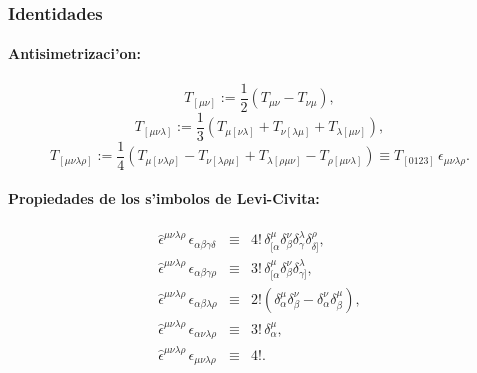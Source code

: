 \subsubsection{Identidades}

\paragraph{Antisimetrizaci'on:}

\begin{equation}
T_{[\mu\nu]}:=\frac{1}{2}(T_{\mu\nu}-T_{\nu\mu}),
\end{equation}
\begin{equation}
T_{[\mu\nu\lambda]}:=\frac{1}{3}(T_{\mu[\nu\lambda]}+T_{\nu[\lambda\mu]}+T_{
\lambda[\mu\nu]}),
\end{equation}
\begin{equation}
T_{[\mu\nu\lambda\rho]}:=\frac{1}{4}(T_{\mu[\nu\lambda\rho]}-T_{\nu[
\lambda\rho\mu]}+T_{\lambda[\rho\mu\nu]}-T_{\rho[\mu\nu\lambda]})\equiv T_{[0123]}\,\epsilon_{\mu\nu\lambda\rho}.
\end{equation}

\paragraph{Propiedades de los s'imbolos de Levi-Civita:}
\begin{eqnarray}
\hat\epsilon^{\mu\nu\lambda\rho}\, \epsilon_{\alpha\beta\gamma\delta}
&\equiv& 4!\,\delta^\mu_{[\alpha}\delta ^\nu_\beta \delta^\lambda_\gamma
\delta^\rho_{\delta]}, \\
\hat\epsilon^{\mu\nu\lambda\rho}\, \epsilon_{\alpha\beta\gamma\rho}
&\equiv& 3!\,\delta^\mu_{[\alpha}\delta ^\nu_\beta \delta^\lambda_{\gamma]}, \\
\hat\epsilon^{\mu\nu\lambda\rho}\, \epsilon_{\alpha\beta\lambda\rho}
&\equiv& 2! \left(\delta^\mu_\alpha\delta ^\nu_\beta -  \delta^\nu_\alpha \delta^\mu_\beta \right),\\
\hat\epsilon^{\mu\nu\lambda\rho}\, \epsilon_{\alpha\nu\lambda\rho}
&\equiv& 3!\,\delta^\mu_\alpha,\\
\hat\epsilon^{\mu\nu\lambda\rho}\, \epsilon_{\mu\nu\lambda\rho}&\equiv& 4!.
\end{eqnarray}


